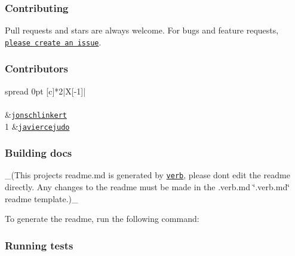 \subsubsection*{Contributing}

Pull requests and stars are always welcome. For bugs and feature requests, \href{../../issues/new}{\tt please create an issue}.

\subsubsection*{Contributors}

\tabulinesep=1mm
\begin{longtabu} spread 0pt [c]{*{2}{|X[-1]}|}
\hline
\rowcolor{\tableheadbgcolor}\\
\endfirsthead
\hline
\endfoot
\hline
\rowcolor{\tableheadbgcolor}\\
  &\href{https://github.com/jonschlinkert}{\tt jonschlinkert}   \\
1  &\href{https://github.com/javiercejudo}{\tt javiercejudo}   \\
\end{longtabu}


\subsubsection*{Building docs}

\+\_\+(This project\textquotesingle{}s readme.\+md is generated by \href{https://github.com/verbose/verb-generate-readme}{\tt verb}, please don\textquotesingle{}t edit the readme directly. Any changes to the readme must be made in the .verb.\+md \char`\"{}.\+verb.\+md\char`\"{} readme template.)\+\_\+

To generate the readme, run the following command\+:




\subsubsection*{Running tests}

